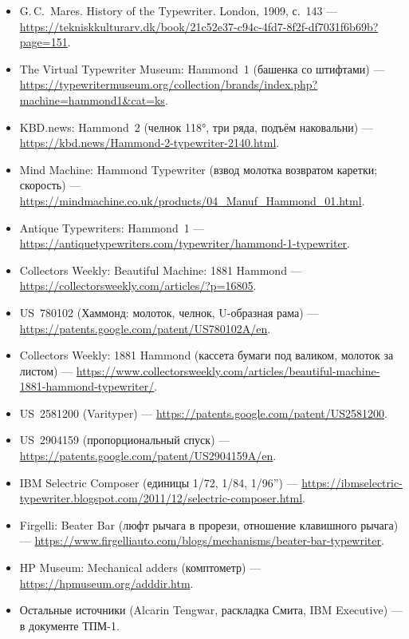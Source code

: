 \begin{itemize}\small
  \item G.\,C.~Mares. History of the Typewriter. London, 1909, с.~143 — \url{https://tekniskkulturarv.dk/book/21c52e37-c94c-4fd7-8f2f-df7031f6b69b?page=151}.
  \item The Virtual Typewriter Museum: Hammond~1 (башенка со штифтами) — \url{https://typewritermuseum.org/collection/brands/index.php?machine=hammond1&cat=ks}.
  \item KBD.news: Hammond~2 (челнок 118°, три ряда, подъём наковальни) — \url{https://kbd.news/Hammond-2-typewriter-2140.html}.
  \item Mind Machine: Hammond Typewriter (взвод молотка возвратом каретки; скорость) — \url{https://mindmachine.co.uk/products/04_Manuf_Hammond_01.html}.
  \item Antique Typewriters: Hammond~1 — \url{https://antiquetypewriters.com/typewriter/hammond-1-typewriter}.
  \item Collectors Weekly: Beautiful Machine: 1881 Hammond — \url{https://collectorsweekly.com/articles/?p=16805}.
  \item US~780102 (Хаммонд: молоток, челнок, U-образная рама) — \url{https://patents.google.com/patent/US780102A/en}.
  \item Collectors Weekly: 1881 Hammond (кассета бумаги под валиком, молоток за листом) — \url{https://www.collectorsweekly.com/articles/beautiful-machine-1881-hammond-typewriter/}.
  \item US~2581200 (Varityper) — \url{https://patents.google.com/patent/US2581200}.
  \item US~2904159 (пропорциональный спуск) — \url{https://patents.google.com/patent/US2904159A/en}.
  \item IBM Selectric Composer (единицы 1/72, 1/84, 1/96'') — \url{https://ibmselectric-typewriter.blogspot.com/2011/12/selectric-composer.html}.
  \item Firgelli: Beater Bar (люфт рычага в прорези, отношение клавишного рычага) — \url{https://www.firgelliauto.com/blogs/mechanisms/beater-bar-typewriter}.
  \item HP Museum: Mechanical adders (комптометр) — \url{https://hpmuseum.org/adddir.htm}.
  \item Остальные источники (Alcarin Tengwar, раскладка Смита, IBM Executive) — в документе ТПМ-1.
\end{itemize}


